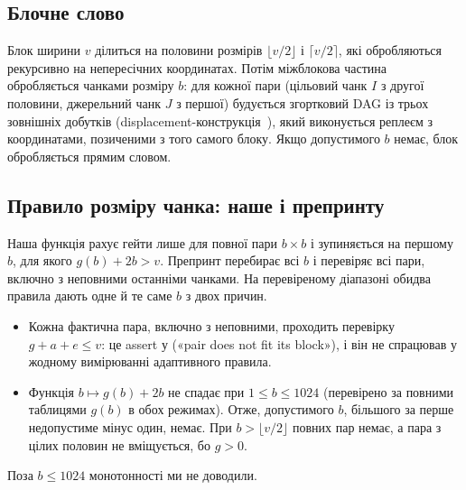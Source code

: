 \documentclass[11pt]{article}
\theoremstyle{plain}
\newcommand{\en}[1]{\foreignlanguage{english}{#1}}
\begin{document}
\subsection{Блочне слово}\label{sec:block}
Блок ширини $v$ ділиться на половини розмірів $\lfloor v/2\rfloor$ і $\lceil v/2\rceil$, які обробляються рекурсивно на непересічних координатах. Потім міжблокова частина обробляється чанками розміру $b$: для кожної пари (цільовий чанк $I$ з другої половини, джерельний чанк $J$ з першої) будується згортковий DAG із трьох зовнішніх добутків (displacement-конструкція~\citep{kailath1979}), який виконується реплеєм з координатами, позиченими з того самого блоку. Якщо допустимого $b$ немає, блок обробляється прямим словом.

\subsection{Правило розміру чанка: наше і препринту}\label{sec:chunk}
Наша функція  рахує гейти лише для повної пари $b\times b$ і зупиняється на першому $b$, для якого $g(b)+2b>v$. Препринт перебирає всі $b$ і перевіряє всі пари, включно з неповними останніми чанками. На перевіреному діапазоні обидва правила дають одне й те саме $b$ з двох причин.
\begin{itemize}
\item Кожна фактична пара, включно з неповними, проходить перевірку $g+a+e\le v$: це assert у  («\en{pair does not fit its block}»), і він не спрацював у жодному вимірюванні адаптивного правила.
\item Функція $b\mapsto g(b)+2b$ не спадає при $1\le b\le1024$ (перевірено за повними таблицями $g(b)$ в обох режимах). Отже, допустимого $b$, більшого за перше недопустиме мінус один, немає. При $b>\lfloor v/2\rfloor$ повних пар немає, а пара з цілих половин не вміщується, бо $g>0$.
\end{itemize}
Поза $b\le1024$ монотонності ми не доводили.
\end{document}
